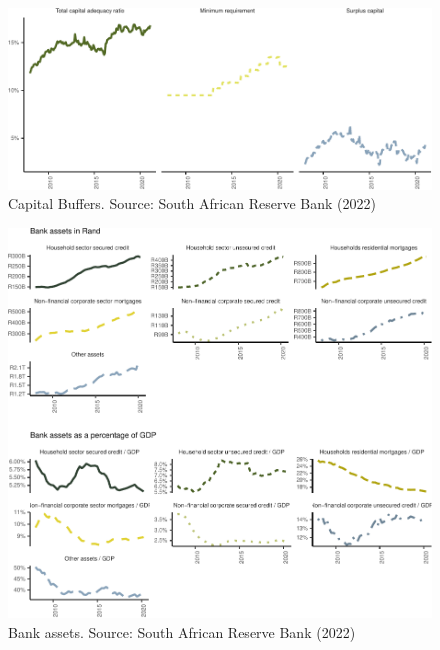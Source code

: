 \documentclass[
]{article}
\begin{document}
\begin{figure}[H]

\includegraphics{Bank_capital_and_bank_lending_files/figure-latex/unnamed-chunk-3-1} \hfill{}

\caption{Capital Buffers. Source: South African Reserve Bank (2022)}\label{fig:unnamed-chunk-3}
\end{figure}

\begin{figure}[H]

\includegraphics{Bank_capital_and_bank_lending_files/figure-latex/unnamed-chunk-6-1} \hfill{}

\caption{Bank assets. Source: South African Reserve Bank (2022)}\label{fig:unnamed-chunk-6}
\end{figure}
\end{document}
